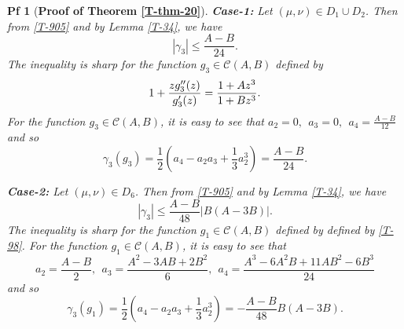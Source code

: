 \documentclass[10pt,a4paper]{amsart}
\newtheorem{pf}{Pf}
\begin{document}
\begin{pf}[\textbf{Proof of Theorem \ref{T-thm-20}}]
\textbf{Case-1:}  Let $(\mu,\nu)\in D_1\cup D_2$. Then from \eqref{T-905} and by Lemma \ref{T-34}, we have
$$
|\gamma_{3}|\le\frac{A-B}{24}.
$$
The inequality is sharp for the function $g_3\in\mathcal{C}(A,B)$ defined by
$$
1 + \frac{zg_3''(z)}{g_3'(z)} = \frac{1+Az^3}{1+Bz^3}.\\
$$
For the function $g_3\in\mathcal{C}(A,B)$, it is easy to see that $a_2=0,~~ a_3=0,~~ a_4=\frac{A-B}{12}$ and so
$$
\gamma_3(g_3)=\frac{1}{2}\left(a_4-a_2a_3+\frac{1}{3}a_2^3\right)=\frac{A-B}{24}.
$$



\textbf{Case-2:} Let $(\mu,\nu)\in D_6$. Then from \eqref{T-905} and by Lemma \ref{T-34}, we have
$$
|\gamma_{3}|\le\frac{A-B}{48}|B(A-3B)|.
$$
The inequality is sharp for the function $g_1\in\mathcal{C}(A,B)$ defined by defined by \eqref{T-98}. For the function $g_1\in\mathcal{C}(A,B)$, it is easy to see that
$$
a_2=\frac{A-B}{2},~~ a_3=\frac{A^2-3AB+2B^2}{6}, ~~a_4=\frac{A^3-6A^2B+11AB^2-6B^3}{24}
$$
and so 
$$\gamma_3(g_1)=\frac{1}{2}\left(a_4-a_2a_3+\frac{1}{3}a_2^3\right)=-\frac{A-B}{48}B(A-3B).$$




\end{pf}
\end{document}

